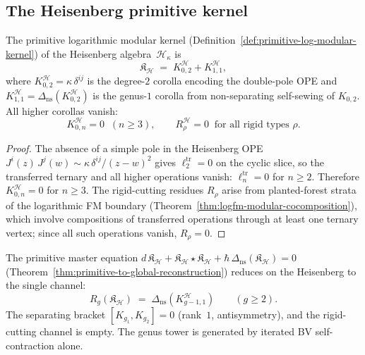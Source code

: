 \subsection{The Heisenberg primitive kernel}
\label{subsec:heisenberg-primitive-kernel}

\begin{proposition}
\label{prop:heisenberg-primitive-kernel}
The primitive logarithmic modular kernel
\textup{(}Definition~\textup{\ref{def:primitive-log-modular-kernel})}
of the Heisenberg algebra~$\mathcal{H}_\kappa$ is
\begin{equation}\label{eq:heisenberg-primitive-kernel}
\mathfrak{K}_{\mathcal{H}}
\;=\;
K_{0,2}^{\mathcal{H}} + K_{1,1}^{\mathcal{H}},
\end{equation}
where $K_{0,2}^{\mathcal{H}} = \kappa\,\delta^{ij}$ is the degree-$2$
corolla encoding the double-pole OPE and
$K_{1,1}^{\mathcal{H}} = \Delta_{\mathrm{ns}}(K_{0,2}^{\mathcal{H}})$
is the genus-$1$ corolla from non-separating self-sewing of
$K_{0,2}$. All higher corollas vanish:
\begin{equation}\label{eq:heisenberg-higher-corollas-vanish}
K_{0,n}^{\mathcal{H}} = 0 \;\; (n \geq 3),
\qquad
R_\rho^{\mathcal{H}} = 0 \;\;\text{for all rigid types } \rho.
\end{equation}
\end{proposition}

\begin{proof}
The absence of a simple pole in the Heisenberg OPE
$J^i(z)\,J^j(w) \sim \kappa\,\delta^{ij}/(z{-}w)^2$
gives $\ell_2^{\mathrm{tr}} = 0$ on the cyclic slice, so the
transferred ternary and all higher operations vanish:
$\ell_n^{\mathrm{tr}} = 0$ for $n \geq 2$. Therefore
$K_{0,n}^{\mathcal{H}} = 0$ for $n \geq 3$. The rigid-cutting
residues $R_\rho$ arise from planted-forest strata of the
logarithmic FM boundary
(Theorem~\ref{thm:logfm-modular-cocomposition}), which involve
compositions of transferred operations through at least one
ternary vertex; since all such operations vanish, $R_\rho = 0$.
\end{proof}

\begin{proposition}
\label{prop:heisenberg-primitive-shell}
The primitive master equation
$d\,\mathfrak{K}_{\mathcal{H}}
+ \mathfrak{K}_{\mathcal{H}} \star \mathfrak{K}_{\mathcal{H}}
+ \hbar\,\Delta_{\mathrm{ns}}(\mathfrak{K}_{\mathcal{H}}) = 0$
\textup{(}Theorem~\textup{\ref{thm:primitive-to-global-reconstruction})}
reduces on the Heisenberg to the single channel:
\begin{equation}\label{eq:heisenberg-shell-genus2}
R_g(\mathfrak{K}_{\mathcal{H}})
\;=\;
\Delta_{\mathrm{ns}}(K_{g-1,1}^{\mathcal{H}})
\qquad (g \geq 2).
\end{equation}
The separating bracket $[K_{g_1}, K_{g_2}] = 0$ \textup{(}rank~$1$,
antisymmetry\textup{)}, and the rigid-cutting channel is empty.
The genus tower is generated by iterated BV self-contraction alone.
\end{proposition}


